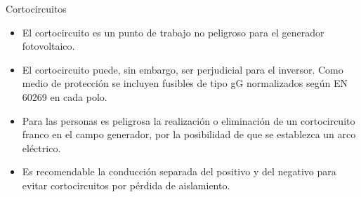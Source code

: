 \documentclass[aspectratio=169, usenames,svgnames,dvipsnames]{beamer}
\begin{document}
\begin{frame}[label={sec:org5d65cc5}]{Cortocircuitos}
\begin{itemize}
\item El \alert{cortocircuito} es un punto de trabajo \alert{no peligroso para el
generador fotovoltaico}.

\item El cortocircuito puede, sin embargo, ser \alert{perjudicial para el
inversor}. Como medio de protección se incluyen fusibles de tipo gG
normalizados según EN 60269 en cada polo.

\item Para las personas es \alert{peligrosa la realización o eliminación de un
cortocircuito franco en el campo generador}, por la posibilidad de
que se establezca un arco eléctrico.

\item Es recomendable la \alert{conducción separada} del positivo y del negativo
para evitar cortocircuitos por pérdida de aislamiento.
\end{itemize}
\end{frame}
\end{document}

